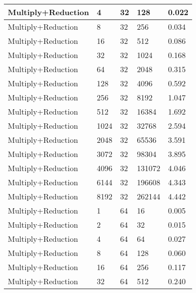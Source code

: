\documentclass{article}
\begin{document}
\begin{longtable}{|l|l|l|l|l|}
Multiply+Reduction & 4    & 32          & 128               & 0.022             \\ \hline
Multiply+Reduction & 8    & 32          & 256               & 0.034             \\ \hline
Multiply+Reduction & 16   & 32          & 512               & 0.086             \\ \hline
Multiply+Reduction & 32   & 32          & 1024              & 0.168             \\ \hline
Multiply+Reduction & 64   & 32          & 2048              & 0.315             \\ \hline
Multiply+Reduction & 128  & 32          & 4096              & 0.592             \\ \hline
Multiply+Reduction & 256  & 32          & 8192              & 1.047             \\ \hline
Multiply+Reduction & 512  & 32          & 16384             & 1.692             \\ \hline
Multiply+Reduction & 1024 & 32          & 32768             & 2.594             \\ \hline
Multiply+Reduction & 2048 & 32          & 65536             & 3.591             \\ \hline
Multiply+Reduction & 3072 & 32          & 98304             & 3.895             \\ \hline
Multiply+Reduction & 4096 & 32          & 131072            & 4.046             \\ \hline
Multiply+Reduction & 6144 & 32          & 196608            & 4.343             \\ \hline
Multiply+Reduction & 8192 & 32          & 262144            & 4.442             \\ \hline
Multiply+Reduction & 1    & 64          & 16                & 0.005             \\ \hline
Multiply+Reduction & 2    & 64          & 32                & 0.015             \\ \hline
Multiply+Reduction & 4    & 64          & 64                & 0.027             \\ \hline
Multiply+Reduction & 8    & 64          & 128               & 0.060             \\ \hline
Multiply+Reduction & 16   & 64          & 256               & 0.117             \\ \hline
Multiply+Reduction & 32   & 64          & 512               & 0.240             \\ \hline

\end{longtable}
\end{document}
